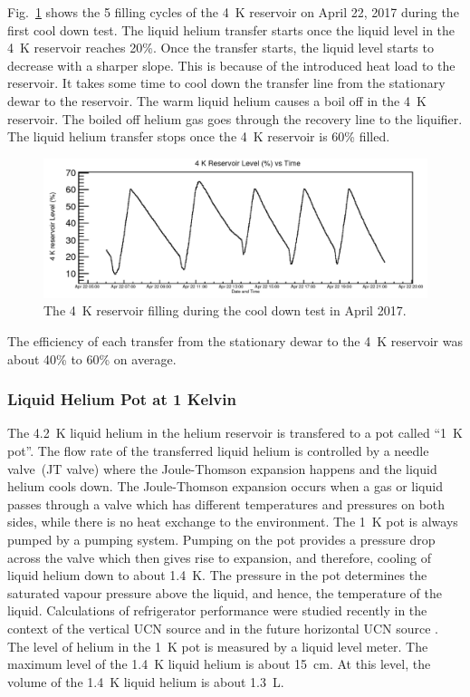 Fig.~\ref{fig:4kfilling} shows the 5 filling cycles of the 4~K
reservoir on April 22, 2017 during the first cool down test. The
liquid helium transfer starts once the liquid level in the 4~K
reservoir reaches 20\%. Once the transfer starts, the liquid level
starts to decrease with a sharper slope. This is because of the
introduced heat load to the reservoir. It takes some time to cool down
the transfer line from the stationary dewar to the reservoir. The warm
liquid helium causes a boil off in the 4~K reservoir. The boiled off
helium gas goes through the recovery line to the liquifier. The liquid
helium transfer stops once the 4~K reservoir is 60\% filled.

\begin{figure}[h!]
  \centering
  \includegraphics[width=1.0\textwidth]{april_4kfilling.png}
  \caption{The 4~K reservoir filling during the cool down test in
    April 2017.}
  \label{fig:4kfilling}
\end{figure}
The efficiency of each transfer from the stationary dewar to the 4~K
reservoir was about 40\% to 60\% on average.

\subsubsection{Liquid Helium Pot at 1 Kelvin}
The 4.2~K liquid helium in the helium reservoir is transfered to a pot
called ``1~K pot''. The flow rate of the transferred liquid helium is
controlled by a needle valve~(JT valve) where the Joule-Thomson
expansion happens and the liquid helium cools down. The Joule-Thomson
expansion occurs when a gas or liquid passes through a valve which has
different temperatures and pressures on both sides, while there is no
heat exchange to the environment.  The 1~K pot is always pumped by a
pumping system. Pumping on the pot provides a pressure drop across the
valve which then gives rise to expansion, and therefore, cooling of
liquid helium down to about 1.4~K. The pressure in the pot determines
the saturated vapour pressure above the liquid, and hence, the
temperature of the liquid.  Calculations of refrigerator performance
were studied recently in the context of the vertical UCN source
\cite{Florian_thesis} and in the future horizontal UCN source
\cite{bib:sweitz}. The level of helium in the 1~K pot is measured by
a liquid level meter. The maximum level of the 1.4~K liquid helium is
about 15~cm. At this level, the volume of the 1.4~K liquid helium is
about 1.3~L.

